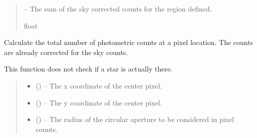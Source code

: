 \documentclass[letterpaper,11pt,english]{sphinxmanual}
\begin{document}
\begin{savenotes}
\begin{fulllineitems}
\begin{savenotes}
\begin{fulllineitems}
\begin{quote}
\begin{description}
\sphinxAtStartPar
{} – The sum of the sky corrected counts for the region defined.

\sphinxAtStartPar
float

\end{description}\end{quote}

\end{fulllineitems}\end{savenotes}


\begin{savenotes}\begin{fulllineitems}
\label{\detokenize{code/opihiexarata.photometry.solution:opihiexarata.photometry.solution.PhotometricSolution._calculate_star_photon_counts_pixel}}
\pysigstartsignatures
{}
\pysigstopsignatures
\sphinxAtStartPar
Calculate the total number of photometric counts at a pixel
location. The counts are already corrected for the sky counts.

\sphinxAtStartPar
This function does not check if a star is actually there.
\begin{quote}\begin{description}
\begin{itemize}
\item {} 
\sphinxAtStartPar
{} () – The x coordinate of the center pixel.

\item {} 
\sphinxAtStartPar
{} () – The y coordinate of the center pixel.

\item {} 
\sphinxAtStartPar
{} () – The radius of the circular aperture to be considered in pixel
counts.


\end{itemize}
\end{description}
\end{quote}
\end{fulllineitems}
\end{savenotes}
\end{fulllineitems}
\end{savenotes}
\end{document}
